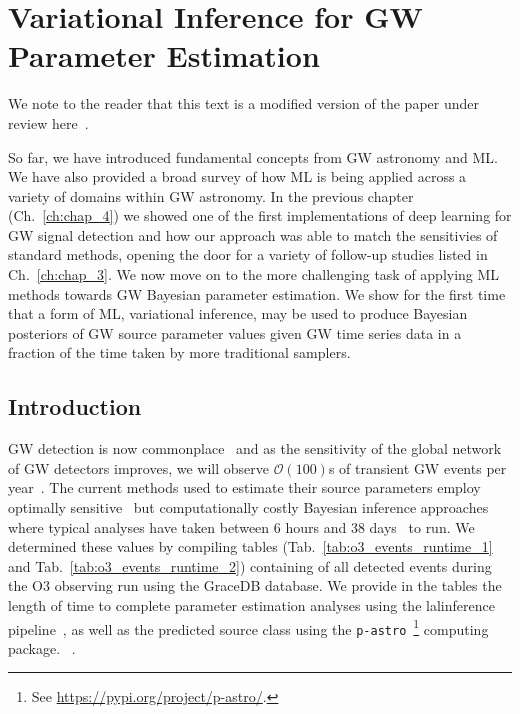 \chapter{Variational Inference for GW Parameter Estimation}\label{ch:chap_5}

We note to the reader that this text is a modified version of the 
paper under review here~\cite{1909.06296}. 

So far, we have introduced fundamental 
concepts from \ac{GW} astronomy and \ac{ML}. We have also provided 
a broad survey of how \ac{ML} is being applied across a variety of 
domains within \ac{GW} astronomy. In the previous chapter (Ch.~\ref{ch:chap_4})
we showed one 
of the first implementations of deep learning for \ac{GW} signal 
detection and how our approach was able to match the sensitivies 
of standard methods, opening the door for a variety of follow-up 
studies listed in Ch.~\ref{ch:chap_3}. We now move on to the more 
challenging task of applying \ac{ML} methods towards \ac{GW} Bayesian 
parameter estimation. We show for the first time that a form of 
\ac{ML}, variational inference, may be used to produce Bayesian posteriors 
of \ac{GW} source parameter values given \ac{GW} time series data in 
a fraction of the time taken by more traditional samplers.

\section{Introduction}

%
%
\ac{GW} detection is now commonplace~\cite{PhysRevX.6.041015,PhysRevLett.119.161101} and as 
the sensitivity of the global network of \ac{GW} detectors 
improves, we will observe $\mathcal{O}(100)$s of transient 
\ac{GW} events per year~\cite{2018LRR....21....3A,1304.0670,1811.12907}. The current 
methods used to estimate their source parameters employ 
optimally sensitive~\cite{2009CQGra..26o5017S} but computationally 
costly Bayesian inference approaches~\cite{1409.7215} where typical 
analyses have taken between 6 hours and 38 days~\cite{gracedb_O3} to run. We 
determined these values by 
compiling tables (Tab.~\ref{tab:o3_events_runtime_1} 
and Tab.~\ref{tab:o3_events_runtime_2}) containing of all 
detected events during the O3 observing 
run using the GraceDB database. We provide in the tables the length of 
time to complete parameter estimation analyses using the lalinference 
pipeline~\cite{1409.7215}, as well as the predicted source 
class using the \texttt{p-astro}~\footnote{See  
\url{https://pypi.org/project/p-astro/}.} computing package.
~.

